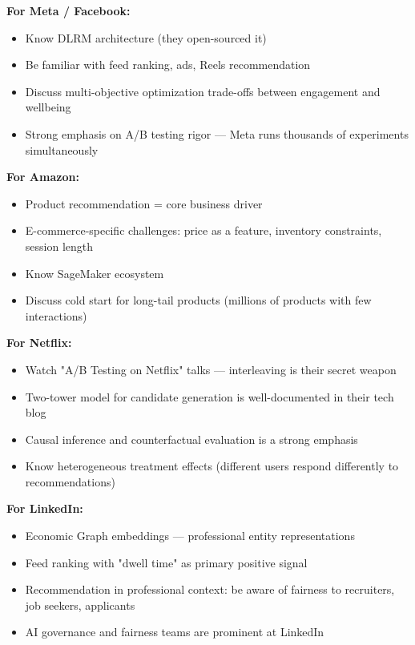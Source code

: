 \documentclass[11pt]{article}
\providecommand{\tightlist}{\setlength{\itemsep}{1pt}\setlength{\parskip}{0pt}}
\begin{document}
\textbf{For Meta / Facebook:}

\begin{itemize}
\tightlist
\item
  Know DLRM architecture (they open-sourced it)
\item
  Be familiar with feed ranking, ads, Reels recommendation
\item
  Discuss multi-objective optimization trade-offs between engagement and wellbeing
\item
  Strong emphasis on A/B testing rigor --- Meta runs thousands of experiments simultaneously
\end{itemize}

\textbf{For Amazon:}

\begin{itemize}
\tightlist
\item
  Product recommendation = core business driver
\item
  E-commerce-specific challenges: price as a feature, inventory constraints, session length
\item
  Know SageMaker ecosystem
\item
  Discuss cold start for long-tail products (millions of products with few interactions)
\end{itemize}

\textbf{For Netflix:}

\begin{itemize}
\tightlist
\item
  Watch "A/B Testing on Netflix" talks --- interleaving is their secret weapon
\item
  Two-tower model for candidate generation is well-documented in their tech blog
\item
  Causal inference and counterfactual evaluation is a strong emphasis
\item
  Know heterogeneous treatment effects (different users respond differently to recommendations)
\end{itemize}

\textbf{For LinkedIn:}

\begin{itemize}
\tightlist
\item
  Economic Graph embeddings --- professional entity representations
\item
  Feed ranking with "dwell time" as primary positive signal
\item
  Recommendation in professional context: be aware of fairness to recruiters, job seekers, applicants
\item
  AI governance and fairness teams are prominent at LinkedIn
\end{itemize}
\end{document}
